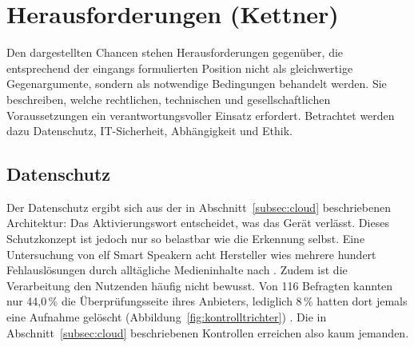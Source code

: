 
\section{Herausforderungen (Kettner)}
\label{sec:herausforderungen}

Den dargestellten Chancen stehen Herausforderungen gegenüber, die entsprechend der eingangs formulierten Position nicht als gleichwertige Gegenargumente, sondern als notwendige Bedingungen behandelt werden. Sie beschreiben, welche rechtlichen, technischen und gesellschaftlichen Voraussetzungen ein verantwortungsvoller Einsatz erfordert. Betrachtet werden dazu Datenschutz, \acs{IT}-Sicherheit, Abhängigkeit und Ethik.

\subsection{Datenschutz}
\label{subsec:datenschutz}

Der Datenschutz ergibt sich aus der in Abschnitt~\ref{subsec:cloud} beschriebenen Architektur: Das Aktivierungswort entscheidet, was das Gerät verlässt. Dieses Schutzkonzept ist jedoch nur so belastbar wie die Erkennung selbst. Eine Untersuchung von elf Smart Speakern acht Hersteller wies mehrere hundert Fehlauslösungen durch alltägliche Medieninhalte nach \cite{schoenherr2022accidental}. Zudem ist die Verarbeitung den Nutzenden häufig nicht bewusst. Von 116 Befragten kannten nur 44,0\,\% die Überprüfungsseite ihres Anbieters, lediglich 8\,\% hatten dort jemals eine Aufnahme gelöscht (Abbildung~\ref{fig:kontrolltrichter}) \cite{malkin2019privacy}. Die in Abschnitt~\ref{subsec:cloud} beschriebenen Kontrollen erreichen also kaum jemanden.

